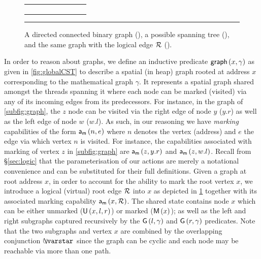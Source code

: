 \begin{figure}
\begin{tabular}{c c c}
\begin{subfigure}[b]{0.3\columnwidth}
    \caption{}
    \label{subfig:graphWithRootEdge}
    \end{subfigure}
    \end{tabular}
\hrule
\caption{A directed connected binary graph (), a possible spanning tree (), and the same graph with the logical edge $\mathcal{R}$ ().}
\label{fig:graphAndTree}
\end{figure}

In order to reason about graphs, we define an inductive predicate $\textsf{graph}\left(x, \gamma\right)$ as given in \fig\ref{fig:globalCST} to describe a spatial (in heap) graph rooted at address $x$ corresponding to the mathematical graph $\gamma$. It represents a spatial graph shared amongst the threads spanning it where each node can be marked (visited) via any of its incoming edges from its predecessors. For instance, in the graph of \fig\ref{subfig:graph}, the $z$ node can be visited via the right edge of node $y$ ($y.r$) as well as the left edge of node $w$ ($w.l$). As such, in our reasoning we have \emph{marking} capabilities of the form $\mathsf{a}_{\textsf{m}}\left(n, e\right)$ where $n$ denotes the vertex (address) and $e$ the edge via which vertex $n$ is visited. For instance, the capabilities associated with marking of vertex $z$ in \fig\ref{subfig:graph} are $\mathsf{a}_{\textsf{m}}\left(z, y.r\right)$ and $\mathsf{a}_{\textsf{m}}\left(z, w.l\right)$. Recall from \S\ref{sec:logic} that the parameterisation of our actions are merely a notational convenience and can be substituted for their full definitions. Given a graph  at root address $x$, in order to account for the ability to mark the root vertex $x$, we introduce a logical (virtual) root edge $\mathcal{R}$ into $x$ as depicted in \fig\ref{subfig:graphWithRootEdge} together with its associated marking capability $\mathsf{a}_{\textsf{m}}\left(x, \mathcal{R}\right)$. The shared state contains node $x$ which can be either unmarked ($\textsf{U}\left(x, l, r\right)$) or marked ($\textsf{M}\left(x\right)$); as well as the left and right subgraphs captured recursively by the $\textsf{G}\left(l, \gamma\right)$ and $\textsf{G}\left(r, \gamma\right)$ predicates. Note that the two subgraphs and vertex $x$ are combined by the overlapping conjunction $\sepish$ since the graph can be cyclic and each node may be reachable via more than one path. 

